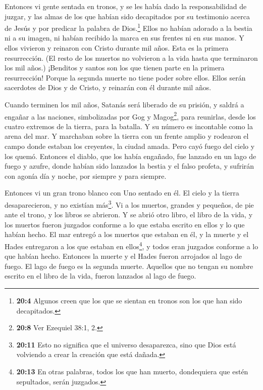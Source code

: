  Entonces vi gente sentada en tronos, y se les había dado la
responsabilidad de juzgar, y las almas de los que habían sido
decapitados por su testimonio acerca de Jesús y por predicar la palabra
de Dios.\footnote{\textbf{20:4} Algunos creen que los que se sientan en
  tronos son los que han sido decapitados.} Ellos no habían adorado a la
bestia ni a su imagen, ni habían recibido la marca en sus frentes ni en
sus manos. Y ellos vivieron y reinaron con Cristo durante mil años.
 Esta es la primera resurrección. (El resto de los muertos
no volvieron a la vida hasta que terminaron los mil años.) 
¡Benditos y santos son los que tienen parte en la primera resurrección!
Porque la segunda muerte no tiene poder sobre ellos. Ellos serán
sacerdotes de Dios y de Cristo, y reinarán con él durante mil años.

 Cuando terminen los mil años, Satanás será liberado de su
prisión,  y saldrá a engañar a las naciones, simbolizadas
por Gog y Magog\footnote{\textbf{20:8} Ver Ezequiel 38:1, 2.}, para
reunirlas, desde los cuatro extremos de la tierra, para la batalla. Y su
número es incontable como la arena del mar.  Y marchaban
sobre la tierra con un frente amplio y rodearon el campo donde estaban
los creyentes, la ciudad amada. Pero cayó fuego del cielo y los quemó.
 Entonces el diablo, que los había engañado, fue lanzado en
un lago de fuego y azufre, donde habían sido lanzados la bestia y el
falso profeta, y sufrirán con agonía día y noche, por siempre y para
siempre.

 Entonces vi un gran trono blanco con Uno sentado en él. El
cielo y la tierra desaparecieron, y no existían más\footnote{\textbf{20:11}
  Esto no significa que el universo desaparezca, sino que Dios está
  volviendo a crear la creación que está dañada.}.  Vi a
los muertos, grandes y pequeños, de pie ante el trono, y los libros se
abrieron. Y se abrió otro libro, el libro de la vida, y los muertos
fueron juzgados conforme a lo que estaba escrito en ellos y lo que
habían hecho.  El mar entregó a los muertos que estaban en
él, y la muerte y el Hades entregaron a los que estaban en
ellos\footnote{\textbf{20:13} En otras palabras, todos los que han
  muerto, dondequiera que estén sepultados, serán juzgados.}, y todos
eran juzgados conforme a lo que habían hecho.  Entonces la
muerte y el Hades fueron arrojados al lago de fuego. El lago de fuego es
la segunda muerte.  Aquellos que no tengan su nombre
escrito en el libro de la vida, fueron lanzados al lago de fuego.

